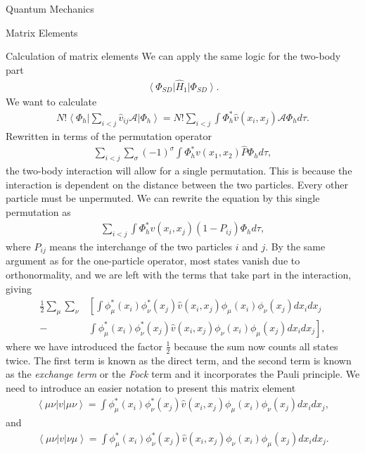 \documentclass[twoside,english]{uiofysmaster}
\begin{document}
\begin{chapter}{Quantum Mechanics}
\begin{section}{Matrix Elements}
\begin{subsection}{Calculation of matrix elements}
			We can apply the same logic for the two-body part
			\begin{align}
				\left< \Phi_{SD} \right| \hat H_1 \left| \Phi_{SD} \right>.
			\end{align}
			We want to calculate 
			\begin{align}
				N! \left< \Phi_h \right| \sum_{i<j} \hat v_{ij} \mathcal{A} \left| \Phi_h \right> = N! \sum_{i<j} \int \Phi_h^* \hat v(x_i,x_j) \mathcal{A} \Phi_h d\tau.
			\end{align}
			Rewritten in terms of the permutation operator
			\begin{align}
				\sum_{i<j} \sum_\sigma (-1)^\sigma \int \Phi_h^* v(x_1,x_2) \hat P \Phi_h d\tau,
			\end{align}
			the two-body interaction will allow for a single permutation. This is because the interaction is dependent on the distance between the two particles. Every other particle must be unpermuted. We can rewrite the equation by this single permutation as
			\begin{align} 
				\sum_{i<j} \int \Phi_h^* v(x_i,x_j) (1 - P_{ij}) \Phi_h d\tau,
			\end{align}
			where $P_{ij}$ means the interchange of the two particles $i$ and $j$. By the same argument as for the one-particle operator, most states vanish due to orthonormality, and we are left with the terms that take part in the interaction, giving
			\begin{align}
				\frac{1}{2} \sum_\mu \sum_\nu & \left[ \int \phi_\mu^*(x_i) \phi_\nu^*(x_j) \hat v(x_i,x_j) \phi_\mu(x_i) \phi_\nu(x_j) d x_i d x_j \right.  \\     -& \left. \int \phi_\mu^*(x_i) \phi_\nu^*(x_j) \hat v(x_i,x_j) \phi_\nu(x_i) \phi_\mu(x_j) d x_i d x_j \right],
			\end{align}
			where we have introduced the factor $\frac{1}{2}$ because the sum now counts all states twice. The first term is known as the direct term, and the second term is known as the \textit{exchange term} or the \textit{Fock} term and it incorporates the Pauli principle. We need to introduce an easier notation to present this matrix element
			\begin{align}
				\left< \mu \nu | v | \mu \nu \right> = \int \phi_\mu^*(x_i) \phi_\nu^*(x_j) \hat v(x_i,x_j) \phi_\mu(x_i) \phi_\nu(x_j) d x_i d x_j,
			\end{align}
			and 
			\begin{align}
				\left< \mu \nu | v | \nu \mu \right> = \int \phi_\mu^*(x_i) \phi_\nu^*(x_j) \hat v(x_i,x_j) \phi_\nu(x_i) \phi_\mu(x_j) d x_i d x_j.

\end{align}
\end{subsection}
\end{section}
\end{chapter}
\end{document}

